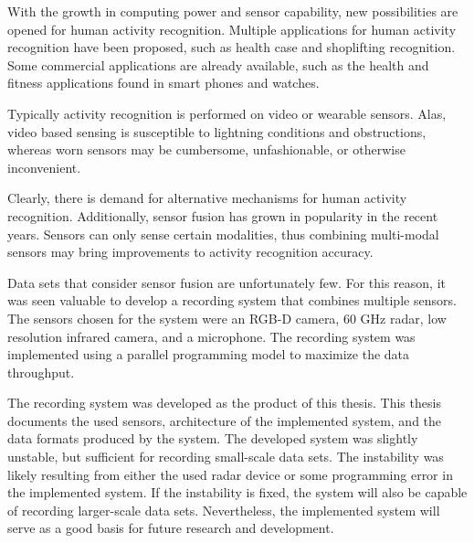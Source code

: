 With the growth in computing power and sensor capability,
new possibilities are opened for human activity recognition.
Multiple applications for human activity recognition have been proposed,
such as health case and shoplifting recognition.
Some commercial applications are already available,
such as the health and fitness applications found in smart phones and watches.

Typically activity recognition is performed on video or wearable sensors.
Alas, video based sensing is susceptible to lightning conditions and obstructions,
whereas worn sensors may be cumbersome, unfashionable, or otherwise inconvenient.

Clearly, there is demand for alternative mechanisms for human activity recognition.
Additionally, sensor fusion has grown in popularity in the recent years.
Sensors can only sense certain modalities,
thus combining multi-modal sensors may bring improvements to activity recognition accuracy.

Data sets that consider sensor fusion are unfortunately few.
For this reason, it was seen valuable to develop a recording system
that combines multiple sensors.
The sensors chosen for the system were an RGB-D camera, 60 GHz radar, low resolution infrared camera, and a microphone.
The recording system was implemented using a parallel programming model to maximize the data throughput.

The recording system was developed as the product of this thesis.
This thesis documents the used sensors,
architecture of the implemented system,
and the data formats produced by the system.
The developed system was slightly unstable,
but sufficient for recording small-scale data sets.
The instability was likely resulting from either the used radar device or some programming error in the implemented system.
If the instability is fixed,
the system will also be capable of recording larger-scale data sets.
Nevertheless, the implemented system will serve as a good basis for future research and development.